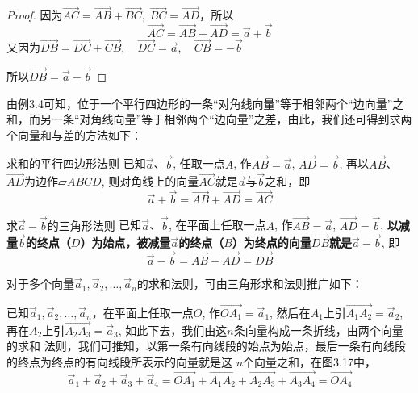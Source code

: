 \begin{proof}
因为$\Vec{AC}=\Vec{AB}+\Vec{BC},\; \Vec{BC}=\Vec{AD}$，所以
\[\Vec{AC}=\Vec{AB}+\Vec{AD}=\vec{a}+\vec{b}\]
又因为$\Vec{DB}=\Vec{DC}+\Vec{CB},\quad \Vec{DC}=\vec{a},\quad \Vec{CB}=-\vec{b}$

所以$\Vec{DB}=\vec{a}-\vec{b}$
\end{proof}    

由例3.4可知，位于一个平行四边形的一条“对角线向量”等于相邻两个“边向量”之和，而另一条“对角线向量”等于相邻两个“边向量”之差，由此，我们还可得到求两个向量和与差的方法如下：

\begin{blk}
   {求和的平行四边形法则} 已知$\vec{a}$、$\vec{b}$, 任取一点$A$, 作$\Vec{AB}=\vec{a}$, $\Vec{AD}=\vec{b}$, 再以$\Vec{AB}$、$\Vec{AD}$为边作$\parallelogram ABCD$, 则对角线上的向量$\Vec{AC}$就是$\vec{a}$与$\vec{b}$之和，即
   \[\vec{a}+\vec{b}=\Vec{AB}+\Vec{AD}=\Vec{AC}\] 
\end{blk}

\begin{blk}
    {求$\vec{a}-\vec{b}$的三角形法则} 已知$\vec{a}$、$\vec{b}$, 在平面上任取一点$A$, 作$\Vec{AB}=\vec{a}$, $\Vec{AD}=\vec{b}$, \textbf{以减量$\vec{b}$的终点（$D$）为始点，被减量$\vec{a}$的终点（$B$）为终点的向量$\Vec{DB}$就是$\vec{a}-\vec{b}$}, 即
    \[\vec{a}-\vec{b}=\Vec{AB}-\Vec{AD}=\Vec{DB}\] 
\end{blk}

对于多个向量$\vec{a}_1,\vec{a}_2,\ldots,\vec{a}_n$的求和法则，可由三角形求和法则推广如下：

已知$\vec{a}_1,\vec{a}_2,\ldots,\vec{a}_n$，在平面上任取一点$O$, 作$\Vec{OA_1}=\vec{a}_1$, 然后在$A_1$上引$\Vec{A_1A_2}=\vec{a}_2$, 再在$A_2$上引$\Vec{A_2A_3}=\vec{a}_3$, 如此下去，我们由这$n$条向量构成一条折线，由两个向量的求和
法则，我们可推知，以第一条有向线段的始点为始点，最后一条有向线段的终点为终点的有向线段所表示的向量就是这
$n$个向量之和，在图3.17中，
\[\vec{a}_1+\vec{a}_2+\vec{a}_3+\vec{a}_4=\Vec{OA_1}+\Vec{A_1A_2}+\Vec{A_2A_3}+\Vec{A_3A_4}=\Vec{OA_4}\]

